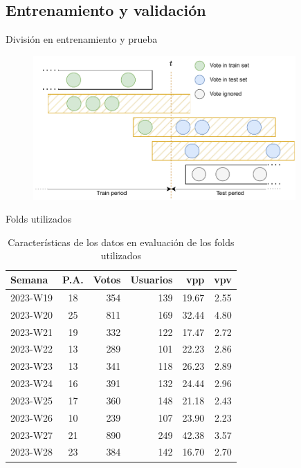 \subsection{Entrenamiento y validación}

\begin{frame}{División en entrenamiento y prueba}
    \begin{figure}
        \centering
        \includegraphics[height=55mm]{images/diagrams/rs-time-folds-evaluacion.drawio.pdf}
    \end{figure}
\end{frame}

\begin{frame}{Folds utilizados}
    \begin{table}
        \footnotesize
        \begin{tabular}{l|c|rrrr}
Semana &
P.A. &
Votos &
Usuarios &
vpp &
vpv
\\
\hline
2023-W19 & 18 & 354 & 139 & 19.67 & 2.55 \\
2023-W20 & 25 & 811 & 169 & 32.44 & 4.80 \\
2023-W21 & 19 & 332 & 122 & 17.47 & 2.72 \\
2023-W22 & 13 & 289 & 101 & 22.23 & 2.86 \\
2023-W23 & 13 & 341 & 118 & 26.23 & 2.89 \\
2023-W24 & 16 & 391 & 132 & 24.44 & 2.96 \\
2023-W25 & 17 & 360 & 148 & 21.18 & 2.43 \\
2023-W26 & 10 & 239 & 107 & 23.90 & 2.23 \\
2023-W27 & 21 & 890 & 249 & 42.38 & 3.57 \\
2023-W28 & 23 & 384 & 142 & 16.70 & 2.70 \\
        \end{tabular}
        \caption{Características de los datos en evaluación de los folds utilizados}
    \end{table}
\end{frame}


